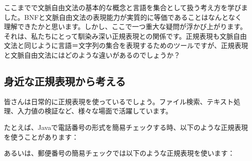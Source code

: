ここまでで文脈自由文法の基本的な概念と言語を集合として扱う考え方を学びました。BNFと文脈自由文法の表現能力が実質的に等価であることはなんとなく理解できたかと思います。しかし、ここで一つ重大な疑問が浮かび上がります。それは、私たちにとって馴染み深い正規表現との関係です。正規表現も文脈自由文法と同じように言語＝文字列の集合を表現するためのツールですが、正規表現と文脈自由文法にはどのような違いがあるのでしょうか？

\hypertarget{chapter4-ux8eabux8fd1ux306aux6b63ux898fux8868ux73feux304bux3089ux8003ux3048ux308b}{%
\subsection{身近な正規表現から考える}\label{chapter4-ux8eabux8fd1ux306aux6b63ux898fux8868ux73feux304bux3089ux8003ux3048ux308b}}

皆さんは日常的に正規表現を使っているでしょう。ファイル検索、テキスト処理、入力値の検証など、様々な場面で活躍しています。

たとえば、Javaで電話番号の形式を簡易チェックする時、以下のような正規表現を使うことがあります：

\begin{Shaded}
\begin{Highlighting}[]
\SpecialCharTok{\textbackslash{}\textbackslash{}}\SpecialCharTok{\textbackslash{}\textbackslash{}}\SpecialCharTok{\textbackslash{}\textbackslash{}}\NormalTok{;  }
\NormalTok{\}}
\end{Highlighting}
\end{Shaded}

あるいは、郵便番号の簡易チェックでは以下のような正規表現を使います：

\begin{Shaded}
\begin{Highlighting}[]
\SpecialCharTok{\textbackslash{}\textbackslash{}}\SpecialCharTok{\textbackslash{}\textbackslash{}}\NormalTok{;  }
\NormalTok{\}}
\end{Highlighting}
\end{Shaded}

